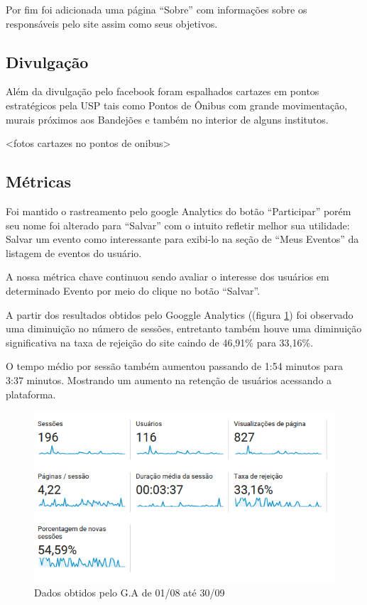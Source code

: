 \par Por fim foi adicionada uma página ``Sobre'' com informações sobre os responsáveis pelo site assim como seus objetivos.
\subsection{Divulgação}
\par Além da divulgação pelo facebook foram espalhados cartazes em pontos estratégicos pela USP tais como Pontos de Ônibus com grande movimentação, murais próximos aos Bandejões e também no interior de alguns institutos.

<fotos cartazes no pontos de onibus>

\subsection{Métricas}

\par Foi mantido o rastreamento pelo google Analytics do botão ``Participar'' porém seu nome foi alterado para ``Salvar'' com o intuito refletir melhor sua utilidade: Salvar um evento como interessante para exibi-lo na seção de ``Meus Eventos'' da listagem de eventos do usuário.

\par A nossa métrica chave continuou sendo avaliar o interesse dos usuários em determinado Evento por meio do clique no botão ``Salvar''.

\par A partir dos resultados obtidos pelo Googgle Analytics ((figura \ref{fig:analytics_2ainteracao_dados}) foi observado uma diminuição no número de sessões, entretanto também houve uma diminuição significativa na taxa de rejeição do site caindo de 46,91\% para 33,16\%.
\par O tempo médio por sessão também aumentou passando de 1:54 minutos para 3:37 minutos. Mostrando um aumento na retenção de usuários acessando a plataforma.
\begin{figure}[htb]
\centering
\includegraphics[width=15cm]{figuras/analytics_2ainteracao_dados}
\caption{\label{fig:analytics_2ainteracao_dados} Dados obtidos pelo G.A de 01/08 até 30/09}
\end{figure}

